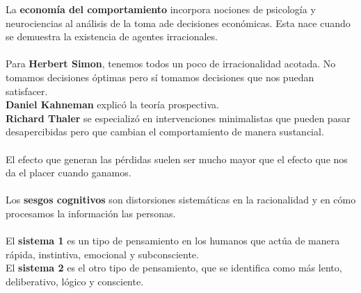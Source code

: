 \documentclass{article}
\begin{document}
        La \textbf{economía del comportamiento} incorpora nociones de psicología y neurociencias al análisis de la toma ade decisiones económicas. Esta nace cuando se demuestra la existencia de agentes irracionales.
        \\
        \\
        Para \textbf{Herbert Simon}, tenemos todos un poco de irracionalidad acotada. No tomamos decisiones óptimas pero sí tomamos decisiones que nos puedan satisfacer.
        \\
        \textbf{Daniel Kahneman} explicó la teoría prospectiva.
        \\
        \textbf{Richard Thaler} se especializó en intervenciones minimalistas que pueden pasar desapercibidas pero que cambian el comportamiento de manera sustancial.
        \\
        \\
        El efecto que generan las pérdidas suelen ser mucho mayor que el efecto que nos da el placer cuando ganamos.
        \\
        \\
        Los \textbf{sesgos cognitivos} son distorsiones sistemáticas en la racionalidad y en cómo procesamos la información las personas.
        \\
        \\
        El \textbf{sistema 1} es un tipo de pensamiento en los humanos que actúa de manera rápida, instintiva, emocional y subconsciente.
        \\
        El \textbf{sistema 2} es el otro tipo de pensamiento, que se identifica como más lento, deliberativo, lógico y consciente.
\end{document}
